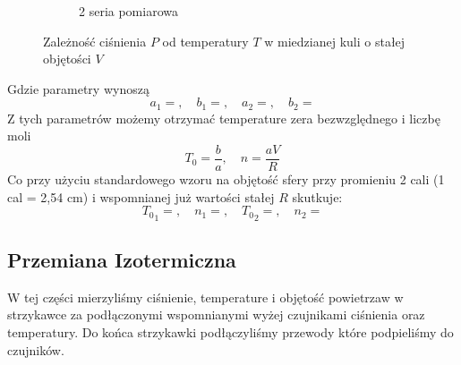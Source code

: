 \documentclass[12pt]{article}
\begin{document}
\begin{figure}[H]
\begin{subfigure}{0.47\textwidth}
        \caption{2 seria pomiarowa}
    \end{subfigure}
    \caption{Zależność ciśnienia \(P\) od temperatury \(T\) w miedzianej kuli o stałej objętości \(V\)}
    \label{fig:izohoric}
\end{figure}
Gdzie parametry wynoszą
\[
    a_1 = , \quad b_1 = , \quad a_2 = , \quad b_2 =
\]
Z tych parametrów możemy otrzymać temperature zera bezwzględnego i liczbę moli
\[
    T_0 = \frac{b}{a}, \quad n = \frac{aV}{R}
\]
Co przy użyciu standardowego wzoru na objętość sfery przy promieniu 2 cali (1 cal = 2{,}54 cm) i wspomnianej już wartości stałej \(R\) skutkuje:
\[
    {T_0}_1 = ,\quad n_1 = ,\quad {T_0}_2 = ,\quad n_2 =
\]

\subsection{Przemiana Izotermiczna}
W tej części mierzyliśmy ciśnienie, temperature i objętość powietrzaw w strzykawce za podłączonymi wspomnianymi wyżej czujnikami ciśnienia oraz temperatury. Do końca strzykawki podłączyliśmy przewody które podpieliśmy do czujników.
\end{document}
